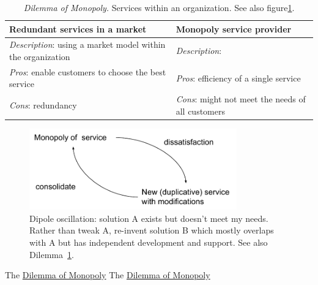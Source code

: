 \begin{center}
\begin{table}[H] %
\begin{tabular}{ | m{\dilemmatablewidth}| m{\dilemmatablewidth} | } 
  \hline
  \textbf{Redundant services in a market} &
  \textbf{Monopoly service provider} \\
  \hline
  \textit{Description}: using a market model within the organization &
  \textit{Description}:  \\  
  \hline
  \textit{Pros}: enable customers to choose the best service &
  \textit{Pros}: efficiency of a single service \\
  \hline
  \textit{Cons}: redundancy & 
  \textit{Cons}: might not meet the needs of all customers \\
  \hline
\end{tabular}
\caption{
\textit{Dilemma of Monopoly.}
Services within an organization. See also figure\ref{fig:market-vs-monopoly}.
}
\label{table:market-vs-monopoly}
\end{table}
\end{center}


\begin{figure}[H] %
    \centering
    \includegraphics[width=0.8\textwidth]{images/dilemma_market_vs_monopoly.pdf}
    \caption{Dipole oscillation: solution A exists but doesn't meet my needs. Rather than tweak A, re-invent solution B which mostly overlaps with A but has independent development and support. See also Dilemma~\ref{table:market-vs-monopoly}.}
    \label{fig:market-vs-monopoly}
\end{figure}


The \href{table:market-vs-monopoly}{Dilemma of Monopoly}
The \href{table:market-vs-monopoly}{Dilemma of Monopoly}


